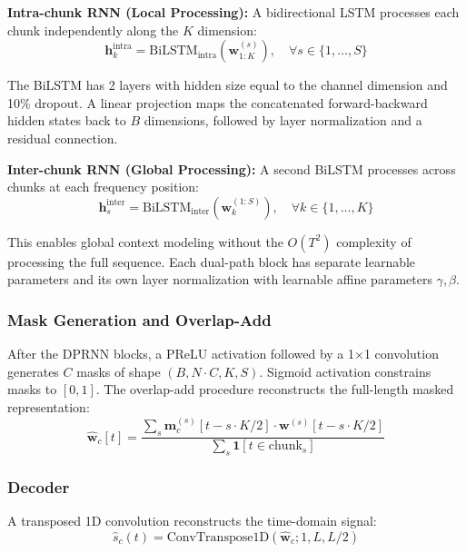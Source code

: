 \documentclass[conference]{IEEEtran}
\begin{document}
\textbf{Intra-chunk RNN (Local Processing):} A bidirectional LSTM processes each chunk independently along the $K$ dimension:
\begin{equation}
\mathbf{h}_k^{\text{intra}} = \text{BiLSTM}_{\text{intra}}(\mathbf{w}_{1:K}^{(s)}), \quad \forall s \in \{1, \ldots, S\}
\end{equation}

The BiLSTM has 2 layers with hidden size equal to the channel dimension and 10\% dropout. A linear projection maps the concatenated forward-backward hidden states back to $B$ dimensions, followed by layer normalization and a residual connection.

\textbf{Inter-chunk RNN (Global Processing):} A second BiLSTM processes across chunks at each frequency position:
\begin{equation}
\mathbf{h}_s^{\text{inter}} = \text{BiLSTM}_{\text{inter}}(\mathbf{w}_{k}^{(1:S)}), \quad \forall k \in \{1, \ldots, K\}
\end{equation}

This enables global context modeling without the $O(T^2)$ complexity of processing the full sequence. Each dual-path block has separate learnable parameters and its own layer normalization with learnable affine parameters $\gamma, \beta$.

\subsubsection{Mask Generation and Overlap-Add}

After the DPRNN blocks, a PReLU activation followed by a 1$\times$1 convolution generates $C$ masks of shape $(B, N \cdot C, K, S)$. Sigmoid activation constrains masks to $[0, 1]$. The overlap-add procedure reconstructs the full-length masked representation:
\begin{equation}
\hat{\mathbf{w}}_c[t] = \frac{\sum_{s} \mathbf{m}_c^{(s)}[t - s \cdot K/2] \cdot \mathbf{w}^{(s)}[t - s \cdot K/2]}{\sum_{s} \mathbf{1}[t \in \text{chunk}_s]}
\end{equation}

\subsubsection{Decoder}

A transposed 1D convolution reconstructs the time-domain signal:
\begin{equation}
\hat{s}_c(t) = \text{ConvTranspose1D}(\hat{\mathbf{w}}_c; 1, L, L/2)
\end{equation}
\end{document}
